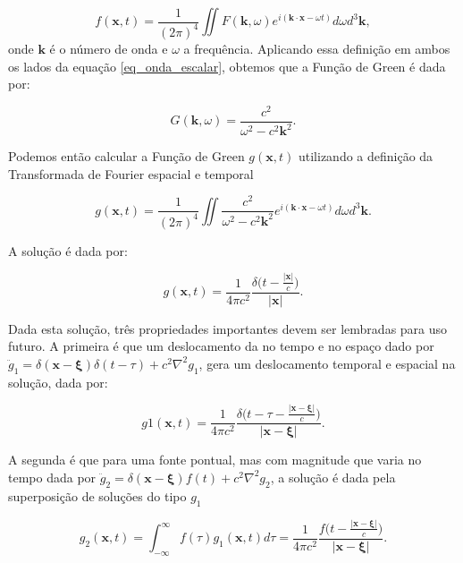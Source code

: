 \documentclass[a4paper,10pt]{article}
\begin{document}
\begin{equation}
 f(\mathbf{x},t) = \frac{1}{(2\pi)^4}\iint F(\mathbf{k},\omega)e^{i(\mathbf{k}\cdot\mathbf{x} - \omega t)}d\omega d^3\mathbf{k},
\end{equation}
onde $\mathbf{k}$ é o número de onda e $\omega$ a frequência. Aplicando essa definição em ambos os lados da equação \ref{eq_onda_escalar}, obtemos que a Função de Green é dada por:

\begin{equation}
 G(\mathbf{k},\omega) = \frac{c^2}{\omega^2 - c^2\mathbf{k}^2}.
\end{equation}

Podemos então calcular a Função de Green $g(\mathbf{x},t)$ utilizando a definição da Transformada de Fourier espacial e temporal

\begin{equation}
 g(\mathbf{x},t) = \frac{1}{(2\pi)^4}\iint \frac{c^2}{\omega^2 - c^2\mathbf{k}^2} e^{i(\mathbf{k}\cdot\mathbf{x} - \omega t)}d\omega d^3\mathbf{k}.
\end{equation}

A solução é dada por:

\begin{equation}
 g(\mathbf{x},t) = \frac{1}{4\pi c^2}\frac{\delta\Big(t - \frac{|\mathbf{x}|}{c}\Big)}{|\mathbf{x}|}.
\end{equation}

Dada esta solução, três propriedades importantes devem ser lembradas para uso futuro. A primeira é que um deslocamento da no tempo e no espaço dado por  $\ddot{g}_1 = \delta(\mathbf{x} - \mathbf{\xi})\delta(t - \tau) + c^2\nabla^2g_1$, gera um deslocamento temporal e espacial na solução, dada por:

\begin{equation}
 g1(\mathbf{x},t) = \frac{1}{4\pi c^2}\frac{\delta\Big(t - \tau - \frac{|\mathbf{x}-\mathbf{\xi}|}{c}\Big)}{|\mathbf{x}-\mathbf{\xi}|}.
\end{equation}

A segunda é que para uma fonte pontual, mas com magnitude que varia no tempo dada por $\ddot{g}_2 = \delta(\mathbf{x} - \mathbf{\xi})f(t) + c^2\nabla^2g_2$, a solução é dada pela superposição de soluções do tipo $g_1$

\begin{equation}
 g_2(\mathbf{x},t) = \int_{-\infty}^{\infty}f(\tau)g_1(\mathbf{x},t)d\tau = \frac{1}{4\pi c^2}\frac{f\Big(t - \frac{|\mathbf{x}-\mathbf{\xi}|}{c}\Big)}{|\mathbf{x}-\mathbf{\xi}|}.
\end{equation}
\end{document}
